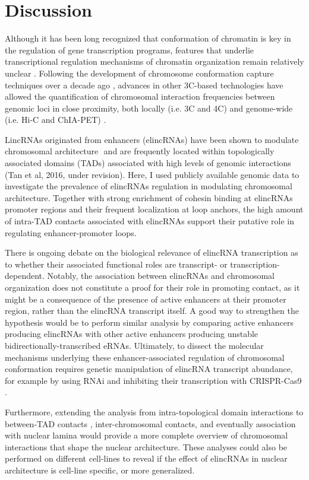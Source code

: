 \documentclass[11pt,a4paper]{report}
\begin{document}
\section*{Discussion}

Although it has been long recognized that conformation of chromatin is key in the regulation of gene transcription programs, features that underlie transcriptional regulation mechanisms of chromatin organization remain relatively unclear \cite{Bonev2016}⁠. Following the development of chromosome conformation capture techniques over a decade ago \cite{Dekker2002}⁠, advances in other 3C-based technologies have allowed the quantification of chromosomal interaction frequencies between genomic loci in close proximity, both locally (i.e. 3C and 4C) and genome-wide (i.e. Hi-C and ChIA-PET) \cite{Dekker2013}.

LincRNAs originated from enhancers (elincRNAs) have been shown to modulate chromosomal architecture \cite{Yin2015}⁠ and are frequently located within topologically associated domains (TADs) associated with high levels of genomic interactions (Tan et al, 2016, under revision). Here, I used publicly available genomic data to investigate the prevalence of elincRNAs regulation in modulating chromosomal architecture. Together with strong enrichment of cohesin binding at elincRNAs promoter regions and their frequent localization at loop anchors, the high amount of intra-TAD contacts associated with elincRNAs support their putative role in regulating enhancer-promoter loops. 

There is ongoing debate on the biological relevance of elincRNA transcription as to whether their associated functional roles are transcript- or transcription-dependent. Notably, the association between elincRNAs and chromosomal organization does not constitute a proof for their role in promoting contact, as it might be a consequence of the presence of active enhancers at their promoter region, rather than the elincRNA transcript itself. A good way to strengthen the hypothesis would be to perform similar analysis by comparing active enhancers producing elincRNAs with other active enhancers producing unstable bidirectionally-transcribed eRNAs. Ultimately, to dissect the molecular mechanisms underlying these enhancer-associated regulation of chromosomal conformation requires genetic manipulation of elincRNA transcript abundance, for example by using RNAi and inhibiting their transcription with CRISPR-Cas9 \cite{Li2013}⁠.

Furthermore, extending the analysis from intra-topological domain interactions to between-TAD contacts \cite{Fraser2015}⁠, inter-chromosomal contacts, and eventually association with nuclear lamina would provide a more complete overview of chromosomal interactions that shape the nuclear architecture. These analyses could also be performed on different cell-lines to reveal if the effect of elincRNAs in nuclear architecture is cell-line specific, or more generalized. 
\end{document}
